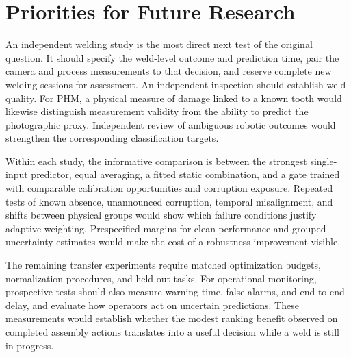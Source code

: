 \section{Priorities for Future Research}
An independent welding study is the most direct next test of the original question. It should specify the weld-level outcome and prediction time, pair the camera and process measurements to that decision, and reserve complete new welding sessions for assessment. An independent inspection should establish weld quality. For PHM, a physical measure of damage linked to a known tooth would likewise distinguish measurement validity from the ability to predict the photographic proxy. Independent review of ambiguous robotic outcomes would strengthen the corresponding classification targets.

Within each study, the informative comparison is between the strongest single-input predictor, equal averaging, a fitted static combination, and a gate trained with comparable calibration opportunities and corruption exposure. Repeated tests of known absence, unannounced corruption, temporal misalignment, and shifts between physical groups would show which failure conditions justify adaptive weighting. Prespecified margins for clean performance and grouped uncertainty estimates would make the cost of a robustness improvement visible.

The remaining transfer experiments require matched optimization budgets, normalization procedures, and held-out tasks. For operational monitoring, prospective tests should also measure warning time, false alarms, and end-to-end delay, and evaluate how operators act on uncertain predictions. These measurements would establish whether the modest ranking benefit observed on completed assembly actions translates into a useful decision while a weld is still in progress.
